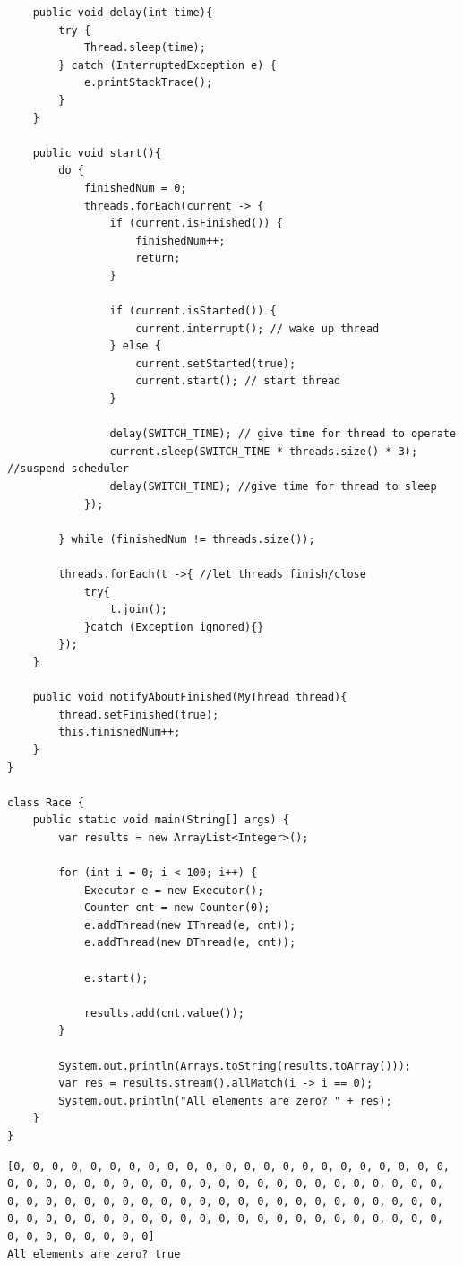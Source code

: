 \documentclass[12pt]{article}
\begin{document}
\begin{verbatim}
    public void delay(int time){
        try {
            Thread.sleep(time);
        } catch (InterruptedException e) {
            e.printStackTrace();
        }
    }

    public void start(){
        do {
            finishedNum = 0;
            threads.forEach(current -> {
                if (current.isFinished()) {
                    finishedNum++;
                    return;
                }

                if (current.isStarted()) {
                    current.interrupt(); // wake up thread
                } else {
                    current.setStarted(true);
                    current.start(); // start thread
                }

                delay(SWITCH_TIME); // give time for thread to operate
                current.sleep(SWITCH_TIME * threads.size() * 3); //suspend scheduler
                delay(SWITCH_TIME); //give time for thread to sleep
            });

        } while (finishedNum != threads.size());

        threads.forEach(t ->{ //let threads finish/close
            try{
                t.join();
            }catch (Exception ignored){}
        });
    }

    public void notifyAboutFinished(MyThread thread){
        thread.setFinished(true);
        this.finishedNum++;
    }
}

class Race {
    public static void main(String[] args) {
        var results = new ArrayList<Integer>();

        for (int i = 0; i < 100; i++) {
            Executor e = new Executor();
            Counter cnt = new Counter(0);
            e.addThread(new IThread(e, cnt));
            e.addThread(new DThread(e, cnt));

            e.start();

            results.add(cnt.value());
        }

        System.out.println(Arrays.toString(results.toArray()));
        var res = results.stream().allMatch(i -> i == 0);
        System.out.println("All elements are zero? " + res);
    }
}
\end{verbatim}

\begin{verbatim}
[0, 0, 0, 0, 0, 0, 0, 0, 0, 0, 0, 0, 0, 0, 0, 0, 0, 0, 0, 0, 0, 0, 0, 0, 0, 0, 0, 0, 0, 0, 0, 0, 0, 0, 0, 0, 0, 0, 0, 0, 0, 0, 0, 0, 0, 0, 0, 0, 0, 0, 0, 0, 0, 0, 0, 0, 0, 0, 0, 0, 0, 0, 0, 0, 0, 0, 0, 0, 0, 0, 0, 0, 0, 0, 0, 0, 0, 0, 0, 0, 0, 0, 0, 0, 0, 0, 0, 0, 0, 0, 0, 0, 0, 0, 0, 0, 0, 0, 0, 0]
All elements are zero? true
\end{verbatim}
\end{document}
